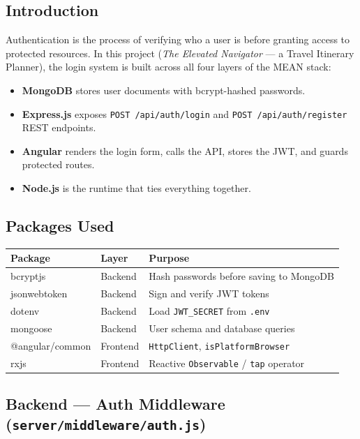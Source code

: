 \documentclass[12pt,a4paper]{article}
\begin{document}
\subsection{Introduction}
Authentication is the process of verifying who a user is before granting access to
protected resources. In this project (\textit{The Elevated Navigator} — a Travel
Itinerary Planner), the login system is built across all four layers of the MEAN stack:

\begin{itemize}
  \item \textbf{MongoDB} stores user documents with bcrypt-hashed passwords.
  \item \textbf{Express.js} exposes \texttt{POST /api/auth/login} and
        \texttt{POST /api/auth/register} REST endpoints.
  \item \textbf{Angular} renders the login form, calls the API, stores the JWT,
        and guards protected routes.
  \item \textbf{Node.js} is the runtime that ties everything together.
\end{itemize}

\subsection{Packages Used}

\begin{center}
\begin{tabular}{lll}
\toprule
\textbf{Package} & \textbf{Layer} & \textbf{Purpose} \\
\midrule
bcryptjs        & Backend  & Hash passwords before saving to MongoDB \\
jsonwebtoken    & Backend  & Sign and verify JWT tokens \\
dotenv          & Backend  & Load \texttt{JWT\_SECRET} from \texttt{.env} \\
mongoose        & Backend  & User schema and database queries \\
@angular/common & Frontend & \texttt{HttpClient}, \texttt{isPlatformBrowser} \\
rxjs            & Frontend & Reactive \texttt{Observable} / \texttt{tap} operator \\
\bottomrule
\end{tabular}
\end{center}

\subsection{Backend — Auth Middleware (\texttt{server/middleware/auth.js})}
\end{document}
